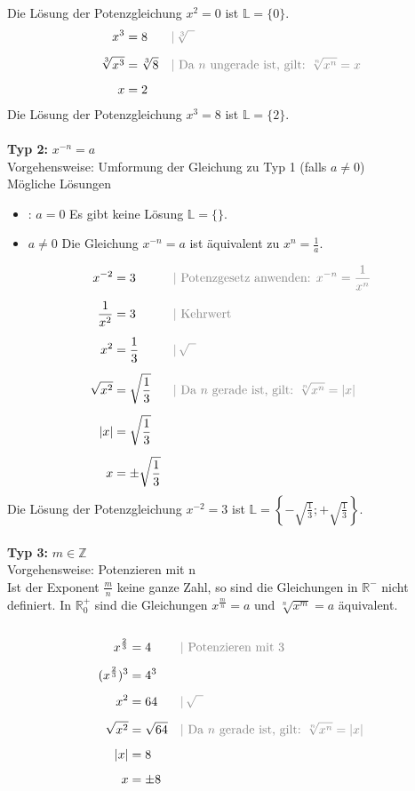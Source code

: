 \documentclass[10pt,landscape]{article}
\begin{document}
\begin{multicols}{3}
    Die Lösung der Potenzgleichung $x^2 = 0$ ist $\mathbb{L} = \{0\}$.
    \begin{align*} x^3 &= 8 &&{\color{gray}|\, \sqrt[3]{\phantom{x}}} \\[5px] \sqrt[3]{x^3} &= \sqrt[3]{8} &&{\color{gray}| \text{ Da $n$ ungerade ist, gilt: } \sqrt[n]{x^n} = x} \\[5px] x &= 2 \end{align*}
    Die Lösung der Potenzgleichung $x^3 = 8$ ist $\mathbb{L} = \{2\}$.\\~\\
    \textbf{Typ 2:} $x^{-n} = a$\\
    Vorgehensweise: Umformung der Gleichung zu Typ 1 (falls $a \neq 0$)\\
    Mögliche Lösungen
    \begin{itemize}
        \item : $a = 0$ Es gibt keine Lösung $\mathbb{L} = \{\}$.
        \item  $a \neq 0$ Die Gleichung $x^{-n} = a$ ist äquivalent zu $x^n = \frac{1}{a}$.
    \end{itemize}
    \begin{align*} x^{-2} &= 3 &&{\color{gray}| \text{ Potenzgesetz anwenden: } x^{-n} = \frac{1}{x^n}} \\[5px] \frac{1}{x^2} &= 3 &&{\color{gray}| \text{ Kehrwert}} \\[5px] x^2 &= \frac{1}{3} &&{\color{gray}|\, \sqrt{\phantom{x}}} \\[5px] \sqrt{x^2} &= \sqrt{\frac{1}{3}} &&{\color{gray}| \text{ Da $n$ gerade ist, gilt: } \sqrt[n]{x^n} = |x|} \\[5px] |x| &= \sqrt{\frac{1}{3}} \\[5px] x &= \pm \sqrt{\frac{1}{3}} \end{align*}
    Die Lösung der Potenzgleichung $x^{-2} = 3$ ist $\mathbb{L} = \left\{-\sqrt{\frac{1}{3}};+\sqrt{\frac{1}{3}}\right\}$.\\~\\
    \textbf{Typ 3:} $m \in \mathbb{Z}$ \\
    Vorgehensweise: Potenzieren mit n\\
    Ist der Exponent $\frac{m}{n}$ keine ganze Zahl, so sind die Gleichungen in $\mathbb{R}^{-}$ nicht definiert. In $\mathbb{R}_{0}^{+}$ sind die Gleichungen $x^{\frac{m}{n}} = a$ und $\sqrt[n]{x^m} = a$ äquivalent.\\~\\
    \begin{align*} x^{\frac{2}{3}} &= 4 &&{\color{gray}| \text{ Potenzieren mit 3}} \\[5px] (x^{\frac{2}{3}})^3 &= 4^3 \\[5px] x^2 &= 64 &&{\color{gray}|\, \sqrt{\phantom{x}}} \\[5px] \sqrt{x^2} &= \sqrt{64} &&{\color{gray}| \text{ Da $n$ gerade ist, gilt: } \sqrt[n]{x^n} = |x|} \\[5px] |x| &= 8 \\[5px] x &= \pm 8 \end{align*}

\end{multicols}
\end{document}
